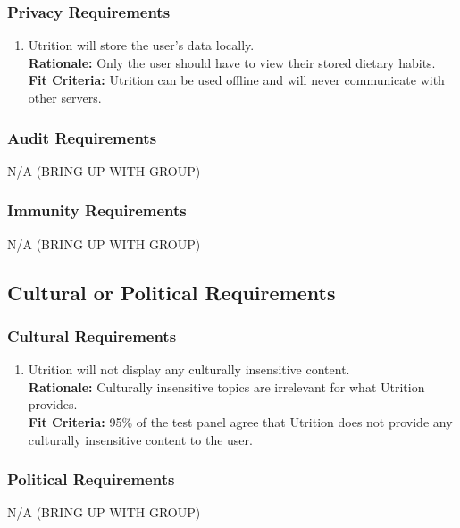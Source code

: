 \documentclass[12pt]{article}
\begin{document}
{\subsubsection{Privacy Requirements}
\begin{enumerate}[{SR}3. ] 
	\item Utrition will store the user’s data locally.\\
	\textbf{Rationale:} Only the user should have to view their stored dietary habits. \\	
	\textbf{Fit Criteria:} Utrition can be used offline and will never communicate with other servers.
\end{enumerate}

\subsubsection{Audit Requirements}
\hspace{1.5cm}N/A (BRING UP WITH GROUP) 

\subsubsection{Immunity Requirements}
\hspace{1.5cm}N/A (BRING UP WITH GROUP) 

\subsection{Cultural or Political Requirements}

\subsubsection{Cultural Requirements}

\begin{enumerate}[{CP}1. ] 
	\item Utrition will not display any culturally insensitive content. \\
	\textbf{Rationale:} Culturally insensitive topics are irrelevant for what Utrition provides.\\	
	\textbf{Fit Criteria:} 95\% of the test panel agree that Utrition does not provide any culturally insensitive content to the user.
\end{enumerate}

\subsubsection{Political Requirements}
\hspace{1.5cm}N/A (BRING UP WITH GROUP) 

}
\end{document}
